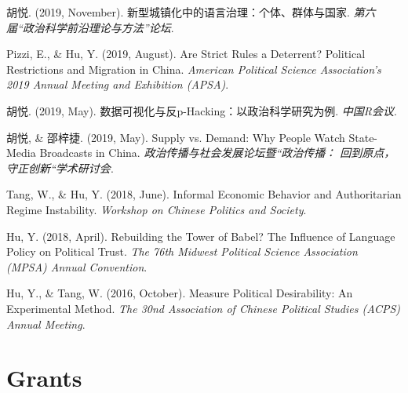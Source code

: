 \documentclass[11pt, a4paper]{awesome-cv}
\begin{document}
\leavevmode\hypertarget{ref-HuYue2019a}{}%
胡悦. (2019, November). 新型城镇化中的语言治理：个体、群体与国家.
\emph{第六届{``政治科学前沿理论与方法''}论坛}.

\leavevmode\hypertarget{ref-PizziHu2019}{}%
Pizzi, E., \& Hu, Y. (2019, August). Are {Strict Rules} a {Deterrent}?
{Political Restrictions} and {Migration} in {China}. \emph{American
{Political Science Association}'s 2019 {Annual Meeting} and {Exhibition}
({APSA})}.

\leavevmode\hypertarget{ref-HuYue2019b}{}%
胡悦. (2019, May). 数据可视化与反p-{Hacking}：以政治科学研究为例.
\emph{{中国R会议}}.

\leavevmode\hypertarget{ref-HuYueShaoZiJie2019}{}%
胡悦, \& 邵梓捷. (2019, May). Supply vs. {Demand}: {Why People Watch
State}-{Media Broadcasts} in {China}.
\emph{政治传播与社会发展论坛暨``政治传播：
回到原点，守正创新``学术研讨会}.

\leavevmode\hypertarget{ref-TangHu2018}{}%
Tang, W., \& Hu, Y. (2018, June). Informal {Economic Behavior} and
{Authoritarian Regime Instability}. \emph{Workshop on {Chinese Politics}
and {Society}}.

\leavevmode\hypertarget{ref-Hu2018a}{}%
Hu, Y. (2018, April). Rebuilding the {Tower} of {Babel}? {The Influence}
of {Language Policy} on {Political Trust}. \emph{The 76th {Midwest
Political Science Association} ({MPSA}) {Annual Convention}}.

\leavevmode\hypertarget{ref-HuTang2016a}{}%
Hu, Y., \& Tang, W. (2016, October). Measure {Political Desirability}:
{An Experimental Method}. \emph{The 30nd {Association} of {Chinese
Political Studies} ({ACPS}) {Annual Meeting}}.

\endgroup

\hypertarget{grants}{%
\section{Grants}\label{grants}}

\begin{cventries}
    \vspace{-4.0mm}
    \vspace{-4.0mm}
    \vspace{-4.0mm}
\end{cventries}
\end{document}
